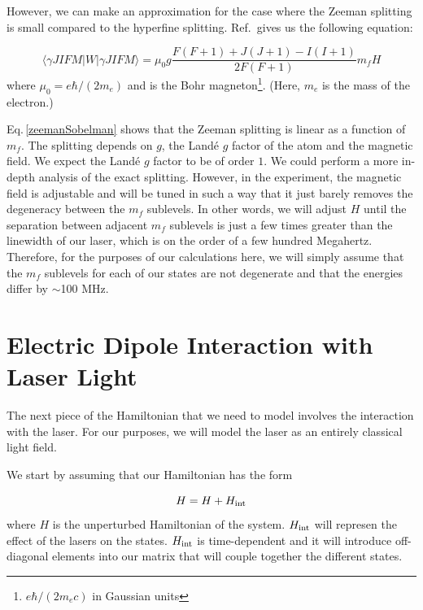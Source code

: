 However, we can make an approximation for the case where the Zeeman splitting is small compared to the hyperfine splitting. 
Ref.\,\cite{sobelman_spectra} gives us the following equation:

\begin{equation} \label{zeemanSobelman}
\langle{\gamma JIFM|W|\gamma JIFM\rangle = \mu_0 g \frac{F(F+1)+J(J+1)-I(I+1)}{2F(F+1)}m_f H}
\end{equation}
where $\mu_0=e\hbar/(2 m_e)$ and is the Bohr magneton\footnote{$e \hbar / (2 m_e c)$ in Gaussian units}. (Here, $m_e$ is the mass of the electron.)

Eq.\,\ref{zeemanSobelman} shows that the Zeeman splitting is linear as a function of $m_f$. The splitting depends on $g$, the Land\'e $g$ factor of the atom and the magnetic field. We expect the Land\'e $g$ factor to be of order $1$. We could perform a more in-depth analysis of the exact splitting. However, in the experiment, the magnetic field is adjustable and will be tuned in such a way that it just barely removes the degeneracy between the $m_f$ sublevels. In other words, we will adjust $H$ until the separation between adjacent $m_f$ sublevels is just a few times greater than the linewidth of our laser, which is on the order of a few hundred Megahertz. Therefore, for the purposes of our calculations here, we will simply assume that the $m_f$ sublevels for each of our states are not degenerate and that the energies differ by $\sim$100 MHz.

\section{Electric Dipole Interaction with Laser Light}

The next piece of the Hamiltonian that we need to model involves the interaction with the laser. For our purposes, we will model the laser as an entirely classical light field.  

We start by assuming that our Hamiltonian has the form 

\begin{equation}
H=H+H_{\textnormal{int}}
\end{equation}
where $H$ is the unperturbed Hamiltonian of the system. $H_{\textnormal{int}}$ will represen the effect of the lasers on the states. $H_\textnormal{int}$ is time-dependent and it will introduce off-diagonal elements into our matrix that will couple together the different states. 

